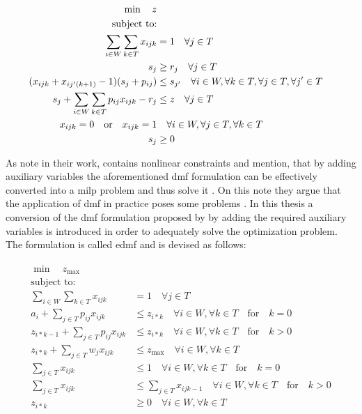 \begin{align}
    \min \quad z \notag \\
    \text{subject to:} \notag \\
    \sum_{i \in W} \sum_{k \in T} x_{ijk} &= 1 \quad \forall j \in T \notag \\
    s_j &\geq r_j \quad \forall j \in T \notag \\
    (x_{ijk} + x_{ij'(k+1)} - 1)(s_j + p_{ij}) &\leq s_{j'} \quad \forall i \in W, \forall k \in T, \forall j \in T, \forall j' \in T \label{eq:nonlinear_constraints_dmf}\\
    s_j + \sum_{i \in W} \sum_{k \in T} p_{ij} x_{ijk} - r_j &\leq z \quad \forall j \in T \notag \\
    x_{ijk} = 0 \quad \text{or} \quad x_{ijk} = 1 &\quad \forall i \in W, \forall j \in T, \forall k \in T \notag \\
    s_j &\geq 0 \notag 
\end{align}

As \citet{Zeng2005} note in their work,  contains nonlinear constraints and mention, that by adding auxiliary variables the aforementioned \gls{dmf} formulation can be effectively converted into a \gls{milp} problem and thus solve it \citep[p. 6]{Zeng2005}. On this note they argue that the application of \gls{dmf} in practice poses some problems \citep{Zeng2005}. In this thesis a conversion of the \gls{dmf} formulation proposed by \citet{Zeng2005} by adding the required auxiliary variables is introduced in order to adequately solve the optimization problem. The formulation is called \gls{edmf} and is devised as follows:

\begin{align}
	\begin{split}
	    \min \quad z_{\text{max}}\\
	    \text{subject to:} \\
	    \sum_{i \in W} \sum_{k \in T} x_{ijk} &= 1 \quad \forall j \in T\\
	    a_i + \sum_{j \in T} p_{ij} x_{ijk} &\leq z_{i*k} \quad \forall i \in W, \forall k \in T \quad \text{for} \quad k=0\\
	    z_{i*k-1} + \sum_{j \in T} p_{ij} x_{ijk} &\leq z_{i*k} \quad \forall i \in W, \forall k \in T \quad \text{for} \quad k>0\\
	    z_{i*k}+ \sum_{j \in T} w_j x_{ijk} &\leq z_{\text{max}} \quad \forall i \in W, \forall k \in T\\
	    \sum_{j \in T} x_{ijk} &\leq 1 \quad \forall i \in W, \forall k \in T \quad \text{for} \quad k=0\\
	    \sum_{j \in T} x_{ijk} &\leq \sum_{j \in T} x_{ijk-1} \quad \forall i \in W, \forall k \in T \quad \text{for} \quad k>0\\
	    z_{i*k} &\geq 0 \quad \forall i \in W, \forall k \in T
	\end{split}
\end{align}

